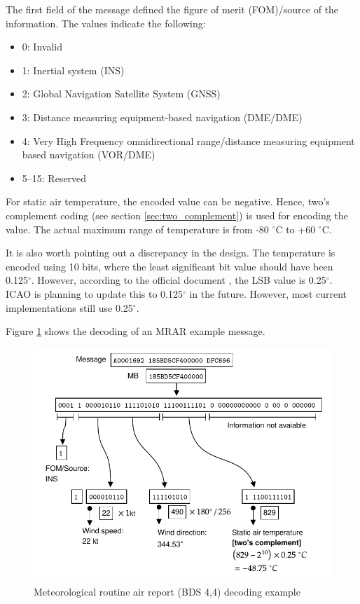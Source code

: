 The first field of the message defined the figure of merit (FOM)/source of the information. The values indicate the following:
\begin{itemize}
    \item 0: Invalid
    \item 1: Inertial system (INS)
    \item 2: Global Navigation Satellite System (GNSS)
    \item 3: Distance measuring equipment-based navigation (DME/DME)
    \item 4: Very High Frequency omnidirectional range/distance measuring equipment based navigation (VOR/DME)
    \item 5--15: Reserved
\end{itemize}

For static air temperature, the encoded value can be negative. Hence, two's complement coding (see section \ref{sec:two_complement}) is used for encoding the value. The actual maximum range of temperature is from -80 $^\circ$C to +60 $^\circ$C.

It is also worth pointing out a discrepancy in the design. The temperature is encoded using 10 bits, where the least significant bit value should have been 0.125$^\circ$. However, according to the official document \cite{icao9871v1}, the LSB value is 0.25$^\circ$. ICAO is planning to update this to 0.125$^\circ$ in the future. However, most current implementations still use 0.25$^\circ$. 

Figure \ref{fig:bds44_example} shows the decoding of an MRAR example message.

\begin{figure}[ht]
    \centering
    \includegraphics[scale=0.9]{figures/mode_s/bds44_example.pdf}
    \caption{Meteorological routine air report (BDS 4,4) decoding example}
    \label{fig:bds44_example}
  \end{figure}
  
